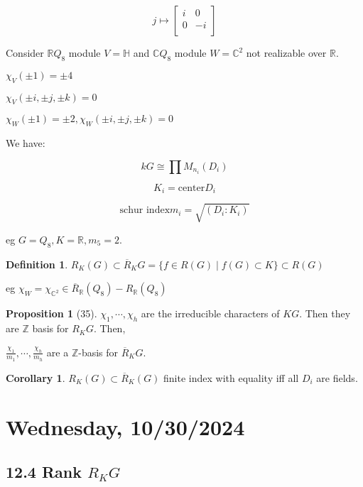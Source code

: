 \documentclass{article}
\theoremstyle{definition}
\newtheorem*{definition}{Definition}
\newtheorem{proposition}[theorem]{Proposition}
\newtheorem{corollary}[theorem]{Corollary}
\begin{document}
\[
    j \mapsto \begin{bmatrix}
        i &  0 \\
        0 &  -i \\
    \end{bmatrix}
\]

Consider \(\mathbb{R} Q_8\) module \(V = \mathbb{H}\) and \(\mathbb{C}Q_8\) module \(W = \mathbb{C}^2\) not realizable over \(\mathbb{R}\).

\(\chi_V(\pm 1) = \pm 4\)

\(\chi_V(\pm i, \pm j,\pm k)=0\) 

\(\chi_W(\pm 1) = \pm 2, \chi_W(\pm i, \pm j, \pm k)=0\)

We have:

\[
    kG \cong \prod M_{n_i} (D_i)
\]

\[
    K_i = \text{center} D_i
\]

\[
    \text{schur index} m_i = \sqrt{(D_i : K_i)} 
\]

eg \(G = Q_8, K = \mathbb{R} , m_5 = 2\).

\begin{definition}
    \(R_K(G) \subset \overline{R}_K G = \{ f\in R(G) \mid f(G) \subset K \} \subset R(G)\) 
\end{definition}

eg \(\chi_W = \chi_{\mathbb{C}^2} \in \overline{R}_{\mathbb{R}}(Q_8) - R_\mathbb{R} (Q_8)\) 

\begin{proposition}
    [35] \(\chi_1, \cdots , \chi_h\) are the irreducible characters of \(KG\). Then they are \(\mathbb{Z}\) basis for \(R_K G\). Then,

    \(\frac{\chi_1}{m_1}, \cdots , \frac{\chi_h}{m_h}\) are a \(\mathbb{Z}\)-basis for \(\overline{R}_K G\). 
\end{proposition}

\begin{corollary}
    \(R_K (G) \subset \overline{R} _K (G)\) finite index with equality iff all \(D_i\) are fields.
\end{corollary}

\section*{Wednesday, 10/30/2024}

\subsection*{12.4 Rank \(R_K G\)}
\end{document}

